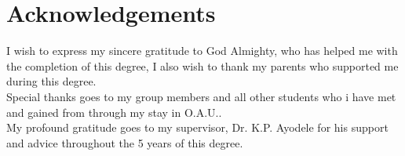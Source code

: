 \chapter*{ \textbf{\Large \sc Acknowledgements}}
\vspace{50pt}

I wish to express my sincere gratitude to God Almighty, who has helped me with the completion of this degree,  I also wish to thank my parents who supported me during this degree.\\
Special thanks goes to my group members and all other students who i have met and gained from through my stay in O.A.U..\\
My profound gratitude goes to my supervisor, Dr. K.P. Ayodele for his support and advice throughout the 5 years of this degree.
